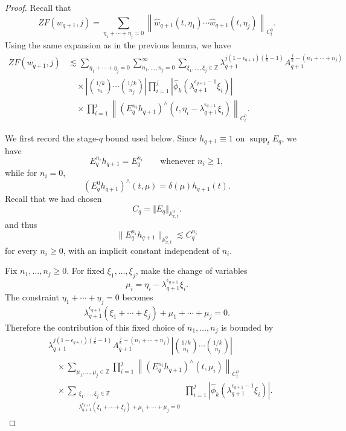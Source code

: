 \documentclass[12pt,reqno,letterpaper]{amsart}
\numberwithin{equation}{section}
\newcommand{\1}{{\bf 1}}
\newcommand{\2}{{\bf 2}}
\newcommand{\A}{\mathbb A}
\theoremstyle{remark}
\theoremstyle{remark}
\begin{document}
\begin{proof}
Recall that
\[
ZF(w_{q+1},j)
=
\sum_{\eta_1+\cdots+\eta_j=0}
\left\|
\hat{w}_{q+1}(t,\eta_1)\cdots
\hat{w}_{q+1}(t,\eta_j)
\right\|_{C_t^0}.
\]
Using the same expansion as in the previous lemma, we have
\[
\begin{aligned}
ZF(w_{q+1},j)
&\lesssim
\sum_{\eta_1+\cdots+\eta_j=0}
\sum_{n_1,\ldots,n_j=0}^{\infty}
\sum_{\xi_1,\ldots,\xi_j\in\mathbb Z}
\lambda_{q+1}^{j(1-\epsilon_{q+1})(\frac1k-1)}
A_{q+1}^{\frac jk-(n_1+\cdots+n_j)}
\\
&\quad\times
\left|
\binom{1/k}{n_1}\cdots\binom{1/k}{n_j}
\right|
\prod_{i=1}^j
\left|
\hat{\phi}_k
\left(\lambda_{q+1}^{\epsilon_{q+1}-1}\xi_i\right)
\right|
\\
&\quad\times
\prod_{i=1}^j
\left\|
\left(E_q^{n_i}h_{q+1}\right)^\wedge
\left(t,\eta_i-\lambda_{q+1}^{\epsilon_{q+1}}\xi_i\right)
\right\|_{C_t^0}.
\end{aligned}
\]

We first record the stage-$q$ bound used below. Since $h_{q+1}\equiv1$ on
$\operatorname{supp}_t E_q$, we have
\[
    E_q^{n_i}h_{q+1}=E_q^{n_i}
    \qquad \text{whenever } n_i\geq1,
\]
while for $n_i=0$,
\[
    \left(E_q^0h_{q+1}\right)^\wedge(t,\mu)
    =
    \delta(\mu)h_{q+1}(t).
\]
Recall that we had chosen
$$
C_q = \Vert E_q \Vert_{\A_{x,t}^0}.
$$
and thus
\[
    \|E_q^{n_i}h_{q+1}\|_{{\mathbb{A}}_{x,t}^{0}}
    \lesssim
    C_q^{n_i}
\]
for every $n_i\geq0$, with an implicit constant independent of $n_i$.

Fix $n_1,\ldots,n_j\geq0$. For fixed $\xi_1,\ldots,\xi_j$, make the change of variables
\[
    \mu_i
    =
    \eta_i-\lambda_{q+1}^{\epsilon_{q+1}}\xi_i.
\]
The constraint $\eta_1+\cdots+\eta_j=0$ becomes
\[
    \lambda_{q+1}^{\epsilon_{q+1}}(\xi_1+\cdots+\xi_j)
    +
    \mu_1+\cdots+\mu_j
    =
    0.
\]
Therefore the contribution of this fixed choice of $n_1,\ldots,n_j$ is bounded by
\[
\begin{aligned}
&\lambda_{q+1}^{j(1-\epsilon_{q+1})(\frac1k-1)}
A_{q+1}^{\frac jk-(n_1+\cdots+n_j)}
\left|
\binom{1/k}{n_1}\cdots\binom{1/k}{n_j}
\right|
\\
&\quad\times
\sum_{\mu_1,\ldots,\mu_j\in\mathbb Z}
\prod_{i=1}^j
\left\|
\left(E_q^{n_i}h_{q+1}\right)^\wedge(t,\mu_i)
\right\|_{C_t^0}
\\
&\quad\times
\sum_{\substack{\xi_1,\ldots,\xi_j\in\mathbb Z\\
\lambda_{q+1}^{\epsilon_{q+1}}(\xi_1+\cdots+\xi_j)
+
\mu_1+\cdots+\mu_j=0}}
\prod_{i=1}^j
\left|
\hat{\phi}_k
\left(\lambda_{q+1}^{\epsilon_{q+1}-1}\xi_i\right)
\right|.
\end{aligned}
\]


\end{proof}
\end{document}
